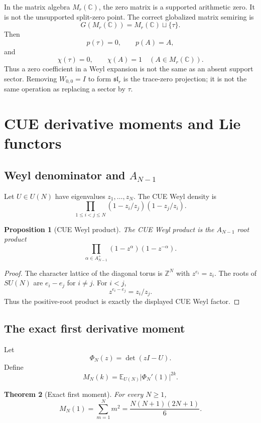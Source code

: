\documentclass[11pt]{amsart}
\newtheorem{theorem}{Theorem}[section]
\newtheorem{proposition}[theorem]{Proposition}
\newcommand{\ZZ}{\mathbb Z}
\newcommand{\CC}{\mathbb C}
\newcommand{\tauz}{\tau}
\begin{document}
In the matrix algebra $M_r(\CC)$, the zero matrix is a supported arithmetic zero.  It is not the unsupported split-zero point.  The correct globalized matrix semiring is
\[
       G(M_r(\CC))=M_r(\CC)\sqcup\{\tauz\}.
\]
Then
\[
       p(\tauz)=0,
       \qquad
       p(A)=A,
\]
and
\[
       \chi(\tauz)=0,
       \qquad
       \chi(A)=1\quad(A\in M_r(\CC)).
\]
Thus a zero coefficient in a Weyl expansion is not the same as an absent support sector.  Removing $W_{0,0}=I$ to form $\mathfrak{sl}_r$ is the trace-zero projection; it is not the same operation as replacing a sector by $\tauz$.

\section{CUE derivative moments and Lie functors}

\subsection{Weyl denominator and $A_{N-1}$}

Let $U\in U(N)$ have eigenvalues $z_1,\ldots,z_N$.  The CUE Weyl density is
\[
       \prod_{1\le i<j\le N}(1-z_i/z_j)(1-z_j/z_i).
\]

\begin{proposition}[CUE Weyl product]
The CUE Weyl product is the $A_{N-1}$ root product
\[
       \prod_{\alpha\in A_{N-1}^+}(1-z^\alpha)(1-z^{-\alpha}).
\]
\end{proposition}

\begin{proof}
The character lattice of the diagonal torus is $\ZZ^N$ with $z^{e_i}=z_i$.  The roots of $SU(N)$ are $e_i-e_j$ for $i\ne j$.  For $i<j$,
\[
       z^{e_i-e_j}=z_i/z_j.
\]
Thus the positive-root product is exactly the displayed CUE Weyl factor.\end{proof}

\subsection{The exact first derivative moment}

Let
\[
       \Phi_N(z)=\det(zI-U).
\]
Define
\[
       M_N(k)=\mathbb E_{U(N)}|\Phi_N'(1)|^{2k}.
\]

\begin{theorem}[Exact first moment]
For every $N\ge1$,
\[
       M_N(1)=\sum_{m=1}^N m^2=\frac{N(N+1)(2N+1)}6.
\]
\end{theorem}
\end{document}
